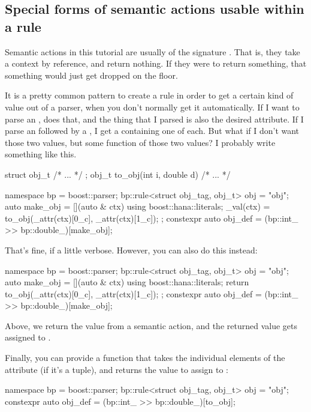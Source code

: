\documentclass{MyBook}
\begin{document}
\subsection{Special forms of semantic actions usable within a rule}

Semantic actions in this tutorial are usually of the signature . That is, they take a context by reference, and return nothing. If they were to return something, that something would just get dropped on the floor.

It is a pretty common pattern to create a rule in order to get a certain kind of value out of a parser, when you don't normally get it automatically. If I want to parse an ,  does that, and the thing that I parsed is also the desired attribute. If I parse an  followed by a , I get a  containing one of each. But what if I don't want those two values, but some function of those two values? I probably write something like this.

\begin{code}
struct obj_t { /* ... */ };
obj_t to_obj(int i, double d) { /* ... */ }

namespace bp = boost::parser;
bp::rule<struct obj_tag, obj_t> obj = "obj";
auto make_obj = [](auto & ctx) {
    using boost::hana::literals;
    _val(ctx) = to_obj(_attr(ctx)[0_c], _attr(ctx)[1_c]);
};
constexpr auto obj_def = (bp::int_ >> bp::double_)[make_obj];
\end{code}

That's fine, if a little verbose. However, you can also do this instead:

\begin{code}
namespace bp = boost::parser;
bp::rule<struct obj_tag, obj_t> obj = "obj";
auto make_obj = [](auto & ctx) {
    using boost::hana::literals;
    return to_obj(_attr(ctx)[0_c], _attr(ctx)[1_c]);
};
constexpr auto obj_def = (bp::int_ >> bp::double_)[make_obj];
\end{code}

Above, we return the value from a semantic action, and the returned value gets assigned to .

Finally, you can provide a function that takes the individual elements of the attribute (if it's a tuple), and returns the value to assign to :

\begin{code}
namespace bp = boost::parser;
bp::rule<struct obj_tag, obj_t> obj = "obj";
constexpr auto obj_def = (bp::int_ >> bp::double_)[to_obj];
\end{code}
\end{document}
